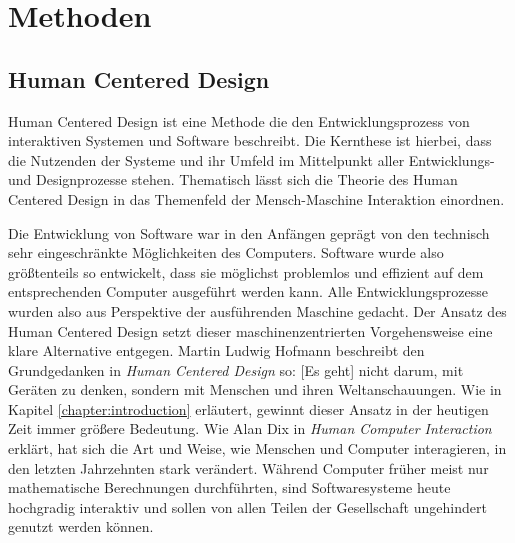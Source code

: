 \chapter{Methoden}
\label{chapter:methods}

\section{Human Centered Design}
Human Centered Design ist eine Methode die den Entwicklungsprozess von
interaktiven Systemen und Software beschreibt. Die Kernthese ist hierbei, dass
die Nutzenden der Systeme und ihr Umfeld im Mittelpunkt aller Entwicklungs- und
Designprozesse stehen. Thematisch lässt sich die Theorie des Human Centered
Design in das Themenfeld der Mensch-Maschine Interaktion
einordnen.\cite{HMI-HCD}

Die Entwicklung von Software war in den Anfängen geprägt von den technisch sehr
eingeschränkte Möglichkeiten des Computers. Software wurde also größtenteils so
entwickelt, dass sie möglichst problemlos und effizient auf dem entsprechenden
Computer ausgeführt werden kann. Alle Entwicklungsprozesse wurden also aus
Perspektive der ausführenden Maschine gedacht. Der Ansatz des Human Centered
Design setzt dieser maschinenzentrierten Vorgehensweise eine klare Alternative
entgegen. Martin Ludwig Hofmann beschreibt den Grundgedanken in \textit{Human
    Centered Design} so: \glqq{} [Es geht] nicht darum, mit Geräten zu denken,
sondern mit Menschen und ihren Weltanschauungen\grqq{}\cite{hcd}. Wie in
Kapitel \ref{chapter:introduction} erläutert, gewinnt dieser Ansatz in der
heutigen Zeit immer größere Bedeutung. Wie Alan Dix in \textit{Human Computer
    Interaction} erklärt, hat sich die Art und Weise, wie Menschen und Computer
interagieren, in den letzten Jahrzehnten stark verändert. Während Computer
früher meist nur mathematische Berechnungen durchführten, sind Softwaresysteme
heute hochgradig interaktiv und sollen von allen Teilen der Gesellschaft
ungehindert genutzt werden können\cite{hci}.

